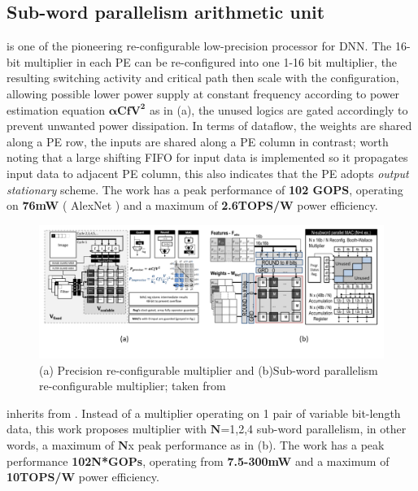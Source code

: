 \subsection{Sub-word parallelism arithmetic unit}
\cite{PrecisionScalableVLSI} is one of the pioneering re-configurable low-precision processor for DNN. The 16-bit multiplier in each PE can be re-configured into one 1-16 bit multiplier, the resulting switching activity and critical path then scale with the configuration, allowing possible lower power supply at constant frequency according to power estimation equation $\boldsymbol{\alpha CfV^2}$ as in  (a), the unused logics are gated accordingly to prevent unwanted power dissipation. In terms of dataflow, the weights are shared along a PE row, the inputs are shared along a PE column in contrast; worth noting that a large shifting FIFO for input data is implemented so it propagates input data to adjacent PE column, this also indicates that the PE adopts \textit{output stationary} scheme. The work has a peak performance of \textbf{102 GOPS}, operating on \textbf{76mW} ( AlexNet ) and a maximum of \textbf{2.6TOPS/W} power efficiency. \\
\begin{figure}[t]
    \centering
    \includegraphics[width=1\linewidth]{inc/2_related_work/figure/precision_scalable_envision.png}
    \caption{(a) Precision re-configurable multiplier and (b)Sub-word parallelism re-configurable multiplier; taken from \cite{PrecisionScalableVLSI}\cite{ENVISION} }
    \label{fig:pre_scal_envi}
\end{figure}
\cite{ENVISION} inherits from \cite{PrecisionScalableVLSI}. Instead of a multiplier operating on 1 pair of variable bit-length data, this work proposes multiplier with $\boldsymbol{N}$=1,2,4 sub-word parallelism, in other words, a maximum of $\boldsymbol{N}$x peak performance as in  (b). The work has a peak performance \textbf{102N*GOPs}, operating from \textbf{7.5-300mW} and a maximum of \textbf{10TOPS/W} power efficiency. \\

